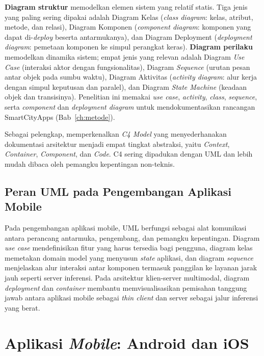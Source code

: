 \textbf{Diagram struktur} memodelkan elemen sistem yang relatif statis. Tiga jenis yang paling sering dipakai adalah Diagram Kelas (\textit{class diagram}: kelas, atribut, metode, dan relasi), Diagram Komponen (\textit{component diagram}: komponen yang dapat di-\textit{deploy} beserta antarmukanya), dan Diagram Deployment (\textit{deployment diagram}: pemetaan komponen ke simpul perangkat keras). \textbf{Diagram perilaku} memodelkan dinamika sistem; empat jenis yang relevan adalah Diagram \textit{Use Case} (interaksi aktor dengan fungsionalitas), Diagram \textit{Sequence} (urutan pesan antar objek pada sumbu waktu), Diagram Aktivitas (\textit{activity diagram}: alur kerja dengan simpul keputusan dan paralel), dan Diagram \textit{State Machine} (keadaan objek dan transisinya). Penelitian ini memakai \textit{use case}, \textit{activity}, \textit{class}, \textit{sequence}, serta \textit{component} dan \textit{deployment diagram} untuk mendokumentasikan rancangan SmartCityApps (Bab~\ref{ch:metode}).

Sebagai pelengkap, \citet{brownC42018} memperkenalkan \textit{C4 Model} yang menyederhanakan dokumentasi arsitektur menjadi empat tingkat abstraksi, yaitu \textit{Context}, \textit{Container}, \textit{Component}, dan \textit{Code}. C4 sering dipadukan dengan UML dan lebih mudah dibaca oleh pemangku kepentingan non-teknis.

\subsection{Peran UML pada Pengembangan Aplikasi Mobile}

Pada pengembangan aplikasi mobile, UML berfungsi sebagai alat komunikasi antara perancang antarmuka, pengembang, dan pemangku kepentingan. Diagram \textit{use case} mendefinisikan fitur yang harus tersedia bagi pengguna, diagram kelas memetakan domain model yang menyusun \textit{state} aplikasi, dan diagram \textit{sequence} menjelaskan alur interaksi antar komponen termasuk panggilan ke layanan jarak jauh seperti server inferensi. Pada arsitektur klien-server multimodal, diagram \textit{deployment} dan \textit{container} membantu memvisualisasikan pemisahan tanggung jawab antara aplikasi mobile sebagai \textit{thin client} dan server sebagai jalur inferensi yang berat.

\section{Aplikasi \textit{Mobile}: Android dan iOS}
\label{sec:mobile}

